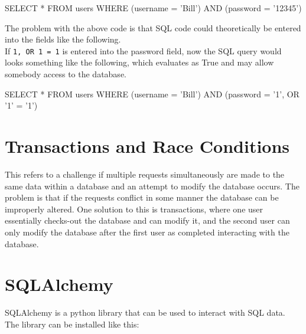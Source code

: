\documentclass[]{book}
\newenvironment{Shaded}{\begin{snugshade}}{\end{snugshade}}
\newcommand{\StringTok}[1]{\textcolor[rgb]{0.31,0.60,0.02}{#1}}
\newcommand{\ExtensionTok}[1]{#1}
\newcommand{\NormalTok}[1]{#1}
\begin{document}
\begin{Shaded}
\begin{Highlighting}[]
\ExtensionTok{SELECT}\NormalTok{ * FROM users WHERE (username = }\StringTok{'Bill'}\NormalTok{) }\ExtensionTok{AND}\NormalTok{ (password = }\StringTok{'12345'}\NormalTok{)}
\end{Highlighting}
\end{Shaded}

The problem with the above code is that SQL code could theoretically be
entered into the fields like the following.\\
If
\texttt{1\textquotesingle{},\ OR\ \textquotesingle{}1\textquotesingle{}\ =\ \textquotesingle{}1\textquotesingle{}}
is entered into the password field, now the SQL query would looks
something like the following, which evaluates as True and may allow
somebody access to the database.

\begin{Shaded}
\begin{Highlighting}[]
\ExtensionTok{SELECT}\NormalTok{ * FROM users WHERE (username = }\StringTok{'Bill'}\NormalTok{) }\ExtensionTok{AND}\NormalTok{ (password = }\StringTok{'1'}\NormalTok{, OR }\StringTok{'1'}\NormalTok{ = }\StringTok{'1'}\NormalTok{)}
\end{Highlighting}
\end{Shaded}

\section{Transactions and Race
Conditions}\label{transactions-and-race-conditions}

This refers to a challenge if multiple requests simultaneously are made
to the same data within a database and an attempt to modify the database
occurs. The problem is that if the requests conflict in some manner the
database can be improperly altered. One solution to this is
transactions, where one user essentially checks-out the database and can
modify it, and the second user can only modify the database after the
first user as completed interacting with the database.

\section{SQLAlchemy}\label{sqlalchemy}

SQLAlchemy is a python library that can be used to interact with SQL
data.\\
The library can be installed like this:
\end{document}
